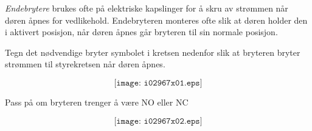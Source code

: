 

\textit{Endebrytere} brukes ofte på elektriske kapslinger for å skru av strømmen når døren åpnes for vedlikehold. Endebryteren monteres ofte slik at døren holder den i aktivert posisjon, når døren åpnes går bryteren til sin normale posisjon. 

Tegn det nødvendige bryter symbolet i kretsen nedenfor slik at bryteren bryter strømmen til styrekretsen når døren åpnes. 

$$\texttt{[image: i02967x01.eps]}$$

Pass på om bryteren trenger å være NO eller NC







$$\texttt{[image: i02967x02.eps]}$$










